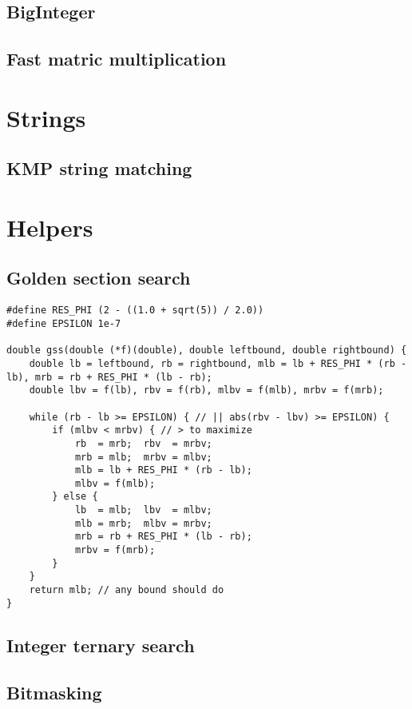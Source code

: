 \documentclass[a4paper]{article}
\begin{document}
	\subsection{BigInteger}
	\subsection{Fast matric multiplication}
	\section{Strings}
	\subsection{KMP string matching}
	\section{Helpers}
	\subsection{Golden section search}
	\begin{lstlisting}
#define RES_PHI (2 - ((1.0 + sqrt(5)) / 2.0))
#define EPSILON 1e-7

double gss(double (*f)(double), double leftbound, double rightbound) {
	double lb = leftbound, rb = rightbound, mlb = lb + RES_PHI * (rb - lb), mrb = rb + RES_PHI * (lb - rb);
	double lbv = f(lb), rbv = f(rb), mlbv = f(mlb), mrbv = f(mrb);
	
	while (rb - lb >= EPSILON) { // || abs(rbv - lbv) >= EPSILON) {
		if (mlbv < mrbv) { // > to maximize
			rb  = mrb;  rbv  = mrbv;
			mrb = mlb;  mrbv = mlbv;
			mlb = lb + RES_PHI * (rb - lb);
			mlbv = f(mlb);
		} else {
			lb  = mlb;  lbv  = mlbv;
			mlb = mrb;  mlbv = mrbv;
			mrb = rb + RES_PHI * (lb - rb);
			mrbv = f(mrb);
		}
	}
	return mlb; // any bound should do
}
	\end{lstlisting}
	\subsection{Integer ternary search}
	\subsection{Bitmasking}
	
\end{document}
